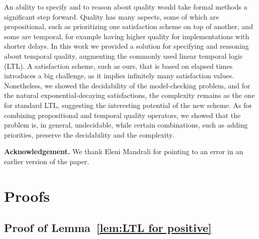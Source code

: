 \documentclass{llncs}
\newcommand{\gap}{\vspace*{0.25 cm}}
\begin{document}
An ability to specify and to reason about quality would take formal methods a significant step forward. 
Quality has many aspects, some of which are propositional, such as prioritizing one satisfaction scheme on top of another, and some are temporal, for example having higher quality for implementations with shorter delays. In this work we provided a solution for specifying and reasoning about temporal quality, augmenting the commonly used linear temporal logic (LTL). A satisfaction scheme, such as ours, that is based on elapsed times introduces a big challenge, as it implies infinitely many satisfaction values. Nonetheless, we showed the decidability of the model-checking problem, and for the natural exponential-decaying satisfactions, the complexity remains as the one for standard LTL, suggesting the interesting potential of the new scheme. As for combining propositional and temporal quality operators, we showed that the problem is, in general, undecidable, while certain combinations, such as adding priorities, preserve the decidability and the complexity.

\gap\noindent
{\bf Acknowledgement.} We thank Eleni Mandrali for pointing to an error in an earlier version of the paper.
\tiny

\normalsize

\newpage
\appendix
\section{Proofs}

\subsection{Proof of Lemma~\ref{lem:LTL for positive}}
\end{document}
